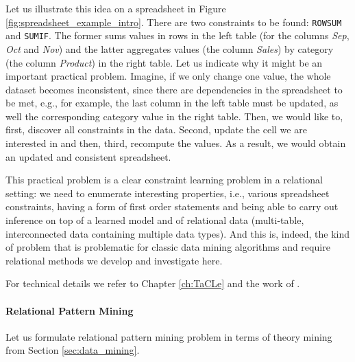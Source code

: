 
Let us illustrate this idea on a spreadsheet in Figure
\ref{fig:spreadsheet_example_intro}. There are two constraints to be
found: \texttt{ROWSUM} and \texttt{SUMIF}. The former sums values in rows
in the left table (for the columns \textit{Sep}, \textit{Oct} and
\textit{Nov}) and the latter aggregates values (the column
\textit{Sales}) by category (the column
\textit{Product}) in the
right table. Let us indicate why it might be
an important practical problem. Imagine, if we only change one value,
the whole dataset becomes
inconsistent, since there are dependencies in the spreadsheet
to be met, e.g., for example, the last column in the left table must be
updated, as well the corresponding category value in the right table.
Then, we would like to, first, discover all constraints in the data.
Second, update the cell we are interested in and then, third,
recompute the values. As a result, we would obtain an updated and
consistent spreadsheet.

This practical problem is a clear constraint learning problem in a relational setting: we need to enumerate interesting properties, i.e., various spreadsheet constraints, having a form of first order statements and being able to carry out inference on top of a learned model and of relational data (multi-table, interconnected data containing multiple data types). And this is, indeed, the kind of problem that is problematic for classic data mining algorithms and require relational methods we develop and investigate here.

For technical details we refer to Chapter \ref{ch:TaCLe} and the work of \textcite{tacle_demo}.
\pubrevend


\paragraph{Relational Pattern Mining}
Let us formulate relational pattern mining problem in terms of theory
mining from Section \ref{sec:data_mining}.\\

